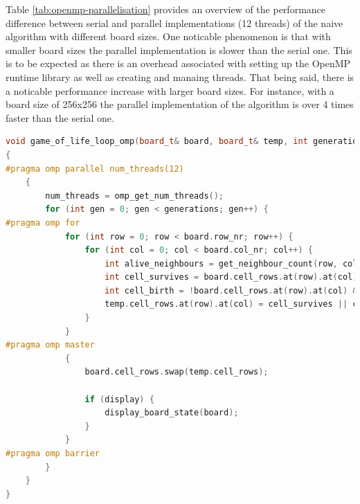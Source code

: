 \documentclass[a4paper,german,12pt,twoside=false]{scrartcl} %
\begin{document}
Table \ref{tab:openmp-parallelisation} provides an overview of the performance difference between serial and parallel implementations (12 threads) of the naive algorithm with different board sizes. One noticable phenomenon is that with smaller board sizes the parallel implementation is slower than the serial one. This is to be expected as there is an overhead associated with setting up the OpenMP runtime library as well as creating and manaing threads. That being said, there is a noticable performance increase with larger board sizes. For instance, with a board size of 256x256 the parallel implementation of the algorithm is over 4 times faster than the serial one. \breakln

\begin{lstlisting}[caption={Parallel Naive State Generation Algorithm},label={lst:gol-parallel-naive-generation-algorithm},language=C++]
void game_of_life_loop_omp(board_t& board, board_t& temp, int generations, int display)
{
#pragma omp parallel num_threads(12)
    {
        num_threads = omp_get_num_threads();
        for (int gen = 0; gen < generations; gen++) {
#pragma omp for
            for (int row = 0; row < board.row_nr; row++) {
                for (int col = 0; col < board.col_nr; col++) {
                    int alive_neighbours = get_neighbour_count(row, col, board);
                    int cell_survives = board.cell_rows.at(row).at(col) && (alive_neighbours == 2 || alive_neighbours == 3);
                    int cell_birth = !board.cell_rows.at(row).at(col) && (alive_neighbours == 3);
                    temp.cell_rows.at(row).at(col) = cell_survives || cell_birth;
                }
            }
#pragma omp master
            {
                board.cell_rows.swap(temp.cell_rows);

                if (display) {
                    display_board_state(board);
                }
            }
#pragma omp barrier
        }
    }
}
\end{lstlisting}
\end{document}
